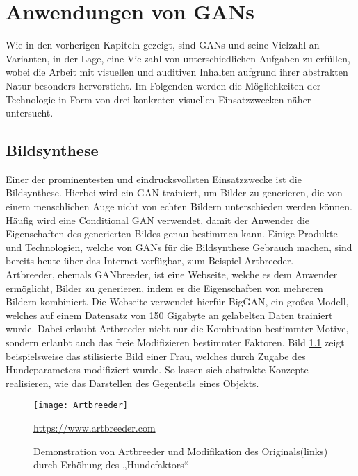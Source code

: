 \chapter{Anwendungen von GANs}

\noindent Wie in den vorherigen Kapiteln gezeigt, sind GANs und seine Vielzahl an Varianten, in der Lage, eine Vielzahl von unterschiedlichen Aufgaben zu erfüllen, wobei die Arbeit mit visuellen und auditiven Inhalten aufgrund ihrer abstrakten Natur besonders hervorsticht. Im Folgenden werden die Möglichkeiten der Technologie in Form von drei konkreten visuellen Einsatzzwecken näher untersucht. \\

\section{Bildsynthese}

\noindent Einer der prominentesten und eindrucksvollsten Einsatzzwecke ist die Bildsynthese. Hierbei wird ein GAN trainiert, um Bilder zu generieren, die von einem menschlichen Auge nicht von echten Bildern unterschieden werden können. Häufig wird eine Conditional GAN verwendet, damit der Anwender die Eigenschaften des generierten Bildes genau bestimmen kann. Einige Produkte und Technologien, welche von GANs für die Bildsynthese Gebrauch machen, sind bereits heute über das Internet verfügbar, zum Beispiel Artbreeder. \\

\noindent Artbreeder, ehemals GANbreeder, ist eine Webseite, welche es dem Anwender ermöglicht, Bilder zu generieren, indem er die Eigenschaften von mehreren Bildern kombiniert. Die Webseite verwendet hierfür BigGAN, ein großes Modell, welches auf einem Datensatz von 150 Gigabyte an gelabelten Daten trainiert wurde. Dabei erlaubt Artbreeder nicht nur die Kombination bestimmter Motive, sondern erlaubt auch das freie Modifizieren bestimmter Faktoren. Bild \ref{fig:artbreeder} zeigt beispielsweise das stilisierte Bild einer Frau, welches durch Zugabe des Hundeparameters modifiziert wurde. So lassen sich abstrakte Konzepte realisieren, wie das Darstellen des Gegenteils eines Objekts. 

\newpage

\begin{figure}[H]
    \centering
    \texttt{[image: Artbreeder]}
    \caption{Demonstration von Artbreeder und Modifikation des Originals(links) durch Erhöhung des „Hundefaktors“} \quelle\url{https://www.artbreeder.com}
\label{fig:artbreeder}
\end{figure}


